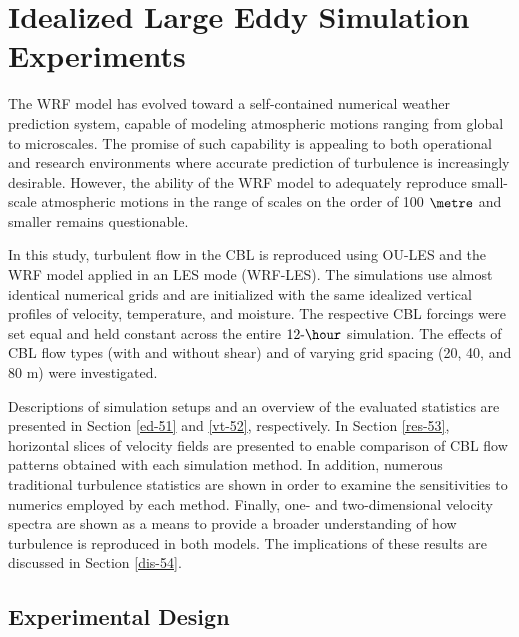 \chapter{Idealized Large Eddy Simulation Experiments}
\label{les-5}

The WRF model has evolved toward a self-contained numerical weather prediction system, capable of modeling atmospheric motions ranging from global to microscales. The promise of such capability is appealing to both operational and research environments where accurate prediction of turbulence is increasingly desirable. However, the ability of the WRF model to adequately reproduce small-scale atmospheric motions in the range of scales on the order of 100 $\metre$  and smaller remains questionable.

In this study, turbulent flow in the CBL is reproduced using OU-LES and the WRF model applied in an LES mode (WRF-LES). The simulations use almost identical numerical grids and are initialized with the same idealized vertical profiles of velocity, temperature, and moisture. The respective CBL forcings were set equal and held constant across the entire $12\mbox{-}\hour$ simulation. The effects of CBL flow types (with and without shear) and of varying grid spacing (20, 40, and 80 m) were investigated.

Descriptions of simulation setups and an overview of the evaluated statistics are presented in Section \autoref{ed-51} and \autoref{vt-52}, respectively. In Section \autoref{res-53}, horizontal slices of velocity fields are presented to enable comparison of CBL flow patterns obtained with each simulation method. In addition, numerous traditional turbulence statistics are shown in order to examine the sensitivities to numerics employed by each method. Finally, one- and two-dimensional velocity spectra are shown as a means to provide a broader understanding of how turbulence is reproduced in both models. The implications of these results are discussed in Section \autoref{dis-54}.

\section{Experimental Design}
\label{ed-51}

